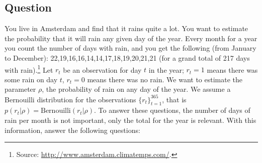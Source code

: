 \documentclass[12pt,a4paper]{article}
\begin{document}
\subsection{Question}
You live in Amsterdam and find that it rains quite a lot.  You want to estimate the probability that it will rain any given day of the year.  Every month for a year you count the number of days with rain, and you get the following (from January to December): 22,19,16,16,14,14,17,18,19,20,21,21 (for a grand total of 217 days with rain).\footnote{Source: \url{http://www.amsterdam.climatemps.com/}.}  Let $r_t$ be an observation for day $t$ in the year; $r_t=1$ means there was some rain on day $t$, $r_t=0$ means there was no rain.  We want to estimate the parameter $\rho$, the probability of rain on any day of the year.  We assume a Bernouilli distribution for the observations $\{r_t\}_{t=1}^{365}$, that is $p( r_t | \rho ) = \text{Bernouilli}(r_t | \rho)$.  To answer these questions, the number of days of rain per month is not important, only the total for the year is relevant.  With this information, answer the following questions:
\end{document}
